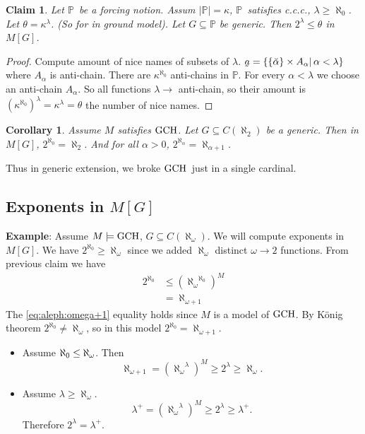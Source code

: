 \documentclass[11pt,pdftex,twoside,a4paper]{article}
\newcommand{\B}[1]{\textbf{#1}}
\newcommand{\ccc}{c.c.c.}
\newcommand{\dsP}{\ensuremath{\mathds{P}}}
\newcommand{\GCH}{\ensuremath{\mathop{\rm GCH}\nolimits}}
\newcommand{\MG}{\ensuremath{M[G]}}
\newcommand{\utilde}[1]{\ensuremath{\underaccent{\tilde}{#1}}}
\newtheorem{claim}[thm]{Claim}
\newtheorem{corollary}[thm]{Corollary}
\theoremstyle{definition}
\begin{document}
\begin{claim}
Let \dsP\ be a forcing notion. Assum \(|\dsP|=\kappa\), \dsP\ satisfies
\ccc, \(\lambda\geq \aleph_0\). Let \(\theta = \kappa^\lambda\).
(So for in ground model). Let \(G\subseteq\dsP\) be generic.
Then \(2^\lambda\leq \theta\) in \MG.
\end{claim}
\begin{proof}
Compute amount of nice names of subsets of \(\lambda\).
\(\utilde{a} = \{\{\breve{\alpha}\}\times A_\alpha|\, \alpha<\lambda\}\)
where \(A_\alpha\) is anti-chain.
There are \(\kappa^{\aleph_0}\) anti-chains in \dsP.
For every \(\alpha<\lambda\) we choose an anti-chain \(A_\alpha\).
So all functions \(\lambda\to\) anti-chain, so their amount is
\(\left(\kappa^{\aleph_0}\right)^\lambda = \kappa^\lambda = \theta\)
the number of nice names.
\end{proof}

\begin{corollary}
Assume $M$ satisfies \GCH. Let \(G\subseteq C(\aleph_2)\) be a generic.
Then in \MG, \(2^{\aleph_0} = \aleph_2\).
And for all \(\alpha>0\), \(2^{\aleph_\alpha}=\aleph_{\alpha+1}\).
\end{corollary}
Thus in generic extension, we broke \GCH\ just in a single cardinal.

\subsection{Exponents in \MG}

\B{Example}: Assume \(M\models\GCH\), \(G\subseteq C(\aleph_\omega)\).
We will compute exponents in \MG.
We have \(2^{\aleph_0} \geq \aleph_\omega\) since we added \(\aleph_\omega\)
distinct \(\omega\to 2\) functions.
From previous claim we have
\begin{align}
  2^{\aleph_0} &\leq \left({\aleph_\omega}^{\aleph_0}\right)^M \nonumber \\
&= \aleph_{\omega+1} \label{eq:aleph:omega+1}
\end{align}
The \eqref{eq:aleph:omega+1} equality holds since $M$ is a model of \GCH.
By K\"onig theorem \(2^{\aleph_0} \neq \aleph_\omega\),
so in this model \(2^{\aleph_0} = \aleph_{\omega+1}\).

\begin{itemize}
\item Assume \(\aleph_0\leq \label < \aleph_\omega\). Then
  \begin{equation*}
  \aleph_{\omega+1}
  = \left({\aleph_\omega}^\lambda\right)^M \geq 2^\lambda \geq \aleph_\omega.
  \end{equation*}
\item Assume \(\lambda \geq \aleph_\omega\).
  \begin{equation*}
  \lambda^+
  = \left({\aleph_\omega}^\lambda\right)^M \geq 2^\lambda \geq \lambda^+.
  \end{equation*}
  Therefore \(2^\lambda = \lambda^+\).
\end{itemize}
\end{document}
